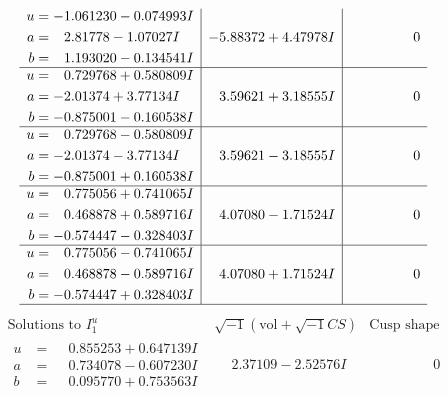 \documentclass[1p]{elsarticle_modified}
\theoremstyle{definition}
\newcommand{\I}{\sqrt{-1}}
\begin{document}
$$\begin{array}{c|c|c}
\begin{aligned}
u &= -1.061230 - 0.074993 I \\
a &= \phantom{-}2.81778 - 1.07027 I \\
b &= \phantom{-}1.193020 - 0.134541 I\end{aligned}
 & -5.88372 + 4.47978 I & \phantom{-0.000000 } 0 \\ \hline\begin{aligned}
u &= \phantom{-}0.729768 + 0.580809 I \\
a &= -2.01374 + 3.77134 I \\
b &= -0.875001 - 0.160538 I\end{aligned}
 & \phantom{-}3.59621 + 3.18555 I & \phantom{-0.000000 } 0 \\ \hline\begin{aligned}
u &= \phantom{-}0.729768 - 0.580809 I \\
a &= -2.01374 - 3.77134 I \\
b &= -0.875001 + 0.160538 I\end{aligned}
 & \phantom{-}3.59621 - 3.18555 I & \phantom{-0.000000 } 0 \\ \hline\begin{aligned}
u &= \phantom{-}0.775056 + 0.741065 I \\
a &= \phantom{-}0.468878 + 0.589716 I \\
b &= -0.574447 - 0.328403 I\end{aligned}
 & \phantom{-}4.07080 - 1.71524 I & \phantom{-0.000000 } 0 \\ \hline\begin{aligned}
u &= \phantom{-}0.775056 - 0.741065 I \\
a &= \phantom{-}0.468878 - 0.589716 I \\
b &= -0.574447 + 0.328403 I\end{aligned}
 & \phantom{-}4.07080 + 1.71524 I & \phantom{-0.000000 } 0\\
 \hline 
 \end{array}$$\newpage$$\begin{array}{c|c|c}  
\text{Solutions to }I^u_{1}& \I (\text{vol} + \sqrt{-1}CS) & \text{Cusp shape}\\
 \hline 
\begin{aligned}
u &= \phantom{-}0.855253 + 0.647139 I \\
a &= \phantom{-}0.734078 - 0.607230 I \\
b &= \phantom{-}0.095770 + 0.753563 I\end{aligned}
 & \phantom{-}2.37109 - 2.52576 I & \phantom{-0.000000 } 0 \\ \hline\begin{aligned}

\end{aligned}
\end{array}$$
\end{document}
